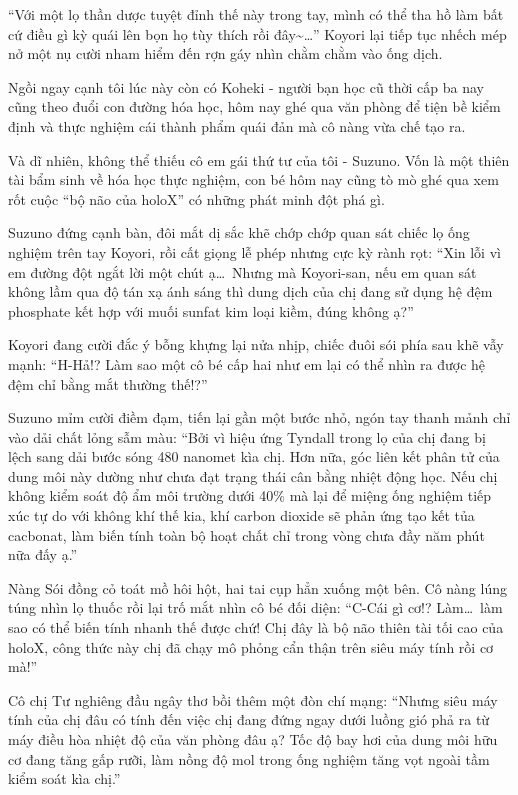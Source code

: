 \documentclass[../main.tex]{subfiles}
\begin{document}
``Với một lọ thần dược tuyệt đỉnh thế này trong tay, mình có thể tha hồ làm bất cứ điều gì kỳ quái lên bọn họ tùy thích rồi đây\~{}\dots'' Koyori lại tiếp tục nhếch mép nở một nụ cười nham hiểm đến rợn gáy nhìn chằm chằm vào ống dịch.

Ngồi ngay cạnh tôi lúc này còn có Koheki - người bạn học cũ thời cấp ba nay cũng theo đuổi con đường hóa học, hôm nay ghé qua văn phòng để tiện bề kiểm định và thực nghiệm cái thành phẩm quái đản mà cô nàng vừa chế tạo ra.

Và dĩ nhiên, không thể thiếu cô em gái thứ tư của tôi - Suzuno. Vốn là một thiên tài bẩm sinh về hóa học thực nghiệm, con bé hôm nay cũng tò mò ghé qua xem rốt cuộc ``bộ não của holoX'' có những phát minh đột phá gì.

Suzuno đứng cạnh bàn, đôi mắt dị sắc khẽ chớp chớp quan sát chiếc lọ ống nghiệm trên tay Koyori, rồi cất giọng lễ phép nhưng cực kỳ rành rọt: ``Xin lỗi vì em đường đột ngắt lời một chút ạ\dots\ Nhưng mà Koyori-san, nếu em quan sát không lầm qua độ tán xạ ánh sáng thì dung dịch của chị đang sử dụng hệ đệm phosphate kết hợp với muối sunfat kim loại kiềm, đúng không ạ?''

Koyori đang cười đắc ý bỗng khựng lại nửa nhịp, chiếc đuôi sói phía sau khẽ vẫy mạnh: ``H-Hả!? Làm sao một cô bé cấp hai như em lại có thể nhìn ra được hệ đệm chỉ bằng mắt thường thế!?''

Suzuno mỉm cười điềm đạm, tiến lại gần một bước nhỏ, ngón tay thanh mảnh chỉ vào dải chất lỏng sẫm màu: ``Bởi vì hiệu ứng Tyndall trong lọ của chị đang bị lệch sang dải bước sóng 480 nanomet kìa chị. Hơn nữa, góc liên kết phân tử của dung môi này dường như chưa đạt trạng thái cân bằng nhiệt động học. Nếu chị không kiểm soát độ ẩm môi trường dưới 40\% mà lại để miệng ống nghiệm tiếp xúc tự do với không khí thế kia, khí carbon dioxide sẽ phản ứng tạo kết tủa cacbonat, làm biến tính toàn bộ hoạt chất chỉ trong vòng chưa đầy năm phút nữa đấy ạ.''

Nàng Sói đồng cỏ toát mồ hôi hột, hai tai cụp hẳn xuống một bên. Cô nàng lúng túng nhìn lọ thuốc rồi lại trố mắt nhìn cô bé đối diện: ``C-Cái gì cơ!? Làm\dots\ làm sao có thể biến tính nhanh thế được chứ! Chị đây là bộ não thiên tài tối cao của holoX, công thức này chị đã chạy mô phỏng cẩn thận trên siêu máy tính rồi cơ mà!''

Cô chị Tư nghiêng đầu ngây thơ bồi thêm một đòn chí mạng: ``Nhưng siêu máy tính của chị đâu có tính đến việc chị đang đứng ngay dưới luồng gió phả ra từ máy điều hòa nhiệt độ của văn phòng đâu ạ? Tốc độ bay hơi của dung môi hữu cơ đang tăng gấp rưỡi, làm nồng độ mol trong ống nghiệm tăng vọt ngoài tầm kiểm soát kìa chị.''
\end{document}
